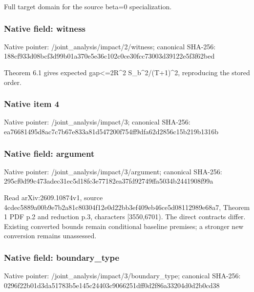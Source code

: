 \documentclass[10pt,a4paper]{article}
\begin{document}
\begingroup\raggedright\sloppy Full target domain for the source beta=\allowbreak{}0 specialization.\par\endgroup

\subsubsection{Native field: witness}
Native pointer: /joint\_\allowbreak{}analysis/impact/2/witness; canonical SHA-256: 188cf933d08bcf3d99b01a370e5e36c102c0ce30fcc73003d39122e5f3f62bed

\begingroup\raggedright\sloppy Theorem 6.1 gives expected gap<=\allowbreak{}2R\textasciicircum{}2 S\_\allowbreak{}b\textasciicircum{}2/\allowbreak{}(T+1)\textasciicircum{}2,\allowbreak{} reproducing the stored order.\par\endgroup

\subsubsection{Native item 4}
Native pointer: /joint\_\allowbreak{}analysis/impact/3; canonical SHA-256: ea76681495d8ac7c7b67e833a81d547200f754ff9dfa62d2856c15b219b1316b

\subsubsection{Native field: argument}
Native pointer: /joint\_\allowbreak{}analysis/impact/3/argument; canonical SHA-256: 295cf0d99c473adec31ec5d18fc3e77182ea37fd92749ffa5034b2441908f99a

\begingroup\raggedright\sloppy Read arXiv:\allowbreak{}2609.10874v1,\allowbreak{} source 4cdec5889a00b9e7b2a81c80304f12e0d22bb3ef409eb46ce5d08112989e68a7,\allowbreak{} Theorem 1 PDF p.2 and reduction p.3,\allowbreak{} characters [3550,\allowbreak{}6701). The direct contracts differ. Existing converted bounds remain conditional baseline premises;\allowbreak{} a stronger new conversion remains unassessed.\par\endgroup

\subsubsection{Native field: boundary\_\allowbreak{}type}
Native pointer: /joint\_\allowbreak{}analysis/impact/3/boundary\_\allowbreak{}type; canonical SHA-256: 0296f22b01d3da51783b5e145c24403c9066251dff0d2f86a33204d0d2b0cd38
\end{document}
